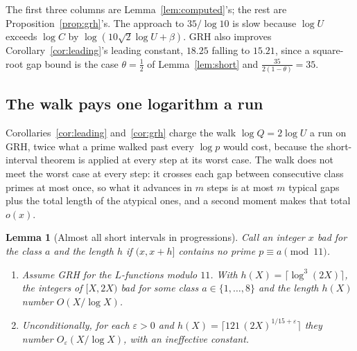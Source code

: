 \documentclass[11pt]{article}
\newtheorem{lemma}[theorem]{Lemma}
\theoremstyle{remark}
\begin{document}
\noindent
The first three columns are Lemma~\ref{lem:computed}'s; the rest are
Proposition~\ref{prop:grh}'s.  The approach to $35/\log10$ is slow because
$\log U$ exceeds $\log C$ by $\log(10\sqrt2\log U+\beta)$.  GRH also improves
Corollary~\ref{cor:leading}'s leading constant, $18.25$ falling to $15.21$,
since a square-root gap bound is the case $\theta=\frac12$ of
Lemma~\ref{lem:short} and $\frac{35}{2(1-\theta)}=35$.

\subsection*{The walk pays one logarithm a run}

Corollaries~\ref{cor:leading} and~\ref{cor:grh} charge the walk
$\log Q=2\log U$ a run on GRH, twice what a prime walked past every $\log p$
would cost, because the short-interval theorem is applied at every step at
its worst case.  The walk does not meet the worst case at every step: it
crosses each gap between consecutive class primes at most once, so what it
advances in $m$ steps is at most $m$ typical gaps plus the total length of
the atypical ones, and a second moment makes that total $o(x)$.

\begin{lemma}[Almost all short intervals in progressions]\label{lem:almost}
Call an integer $x$ bad for the class $a$ and the length $h$ if $(x,x+h]$
contains no prime $p\equiv a\pmod{11}$.
\begin{enumerate}
\item[(i)] Assume GRH for the $L$-functions modulo $11$.  With
$h(X)=\lceil\log^3(2X)\rceil$, the integers of $[X,2X)$ bad for some class
$a\in\{1,\ldots,8\}$ and the length $h(X)$ number $O(X/\log X)$.
\item[(ii)] Unconditionally, for each $\varepsilon>0$ and
$h(X)=\lceil121\,(2X)^{1/15+\varepsilon}\rceil$ they number
$O_\varepsilon(X/\log X)$, with an ineffective constant.
\end{enumerate}
\end{lemma}
\end{document}
